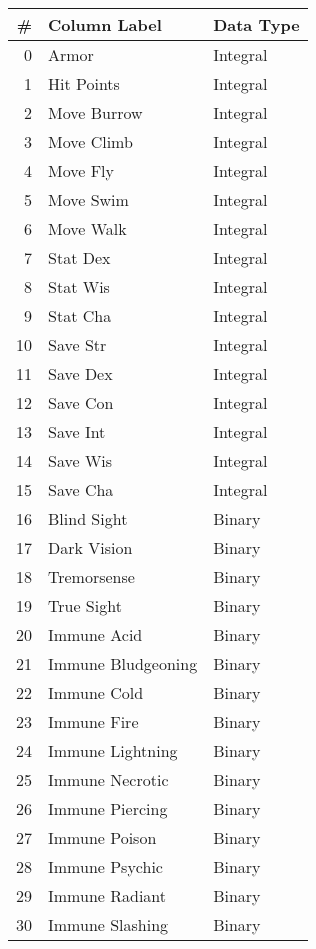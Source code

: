 \documentclass[12pt]{diazessay}
\begin{document}
\begin{table}[!htbp] \centering 
	\caption{\bfseries Final Dataset}
	\label{tab:final-dataset}
\begin{scriptsize}
\begin{minipage}[b]{0.45\linewidth}\centering
\begin{longtable}[]{@{}rll@{}}
	\toprule
	\# & Column Label & Data Type \\
	\midrule
	\endhead
	0 & Armor & Integral \\
	1 & Hit Points & Integral \\
	2 & Move Burrow & Integral \\
	3 & Move Climb & Integral \\
	4 & Move Fly & Integral \\
	5 & Move Swim & Integral \\
	6 & Move Walk & Integral \\
	7 & Stat Dex & Integral \\
	8 & Stat Wis & Integral \\
	9 & Stat Cha & Integral \\
	10 & Save Str & Integral \\
	11 & Save Dex & Integral \\
	12 & Save Con & Integral \\
	13 & Save Int & Integral \\
	14 & Save Wis & Integral \\
	15 & Save Cha & Integral \\
	16 & Blind Sight & Binary \\
	17 & Dark Vision & Binary \\
	18 & Tremorsense & Binary \\
	19 & True Sight & Binary \\
	20 & Immune Acid & Binary \\
	21 & Immune Bludgeoning & Binary \\
	22 & Immune Cold & Binary \\
	23 & Immune Fire & Binary \\
	24 & Immune Lightning & Binary \\
	25 & Immune Necrotic & Binary \\
	26 & Immune Piercing & Binary \\
	27 & Immune Poison & Binary \\
	28 & Immune Psychic & Binary \\
	29 & Immune Radiant & Binary \\
	30 & Immune Slashing & Binary \\

\end{longtable}
\end{minipage}
\end{scriptsize}
\end{table}
\end{document}
